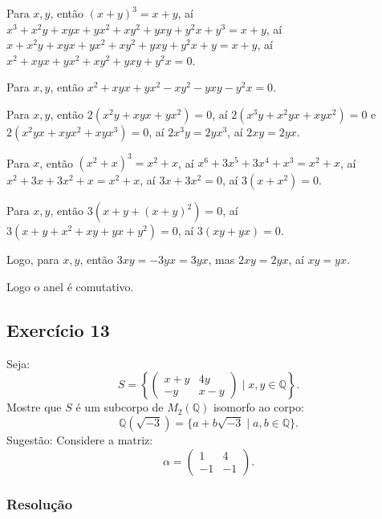 \documentclass[10pt,a4paper]{article}
\begin{document}
\medskip
\noindent
Para $x,y$, então $(x+y)^3=x+y$, aí $x^3+x^2y+xyx+yx^2+xy^2+yxy+y^2x+y^3=x+y$, aí $x+x^2y+xyx+yx^2+xy^2+yxy+y^2x+y=x+y$, aí $x^2+xyx+yx^2+xy^2+yxy+y^2x=0$.

\medskip
\noindent
Para $x,y$, então $x^2+xyx+yx^2-xy^2-yxy-y^2x=0$.

\medskip
\noindent
Para $x,y$, então $2(x^2y+xyx+yx^2)=0$, aí $2(x^3y+x^2yx+xyx^2)=0$ e $2(x^2yx+xyx^2+xyx^3)=0$, aí $2x^3y=2yx^3$, aí $2xy=2yx$.

\medskip
\noindent
Para $x$, então $(x^2+x)^3=x^2+x$, aí $x^6+3x^5+3x^4+x^3=x^2+x$, aí $x^2+3x+3x^2+x=x^2+x$, aí $3x+3x^2=0$, aí $3(x+x^2)=0$.

\medskip
\noindent
Para $x,y$, então $3(x+y+(x+y)^2)=0$, aí $3(x+y+x^2+xy+yx+y^2)=0$, aí $3(xy+yx)=0$.

\medskip
\noindent
Logo, para $x,y$, então $3xy=-3yx=3yx$, mas $2xy=2yx$, aí $xy=yx$.

\medskip
\noindent
Logo o anel é comutativo.

\subsection*{Exercício 13}

Seja:
\[
S=\left\{\begin{pmatrix}
x+y&4y\\-y&x-y
\end{pmatrix}\mid x,y\in\mathbb{Q}\right\}.
\]
Mostre que $S$ é um subcorpo de $M_2(\mathbb{Q})$ isomorfo ao corpo:
\[
\mathbb{Q}(\sqrt{-3})=\{a+b\sqrt{-3}\mid a,b\in\mathbb{Q}\}.
\]
Sugestão: Considere a matriz:
\[
\alpha=\begin{pmatrix}
1&4\\-1&-1
\end{pmatrix}.
\]

\subsubsection*{Resolução}
\end{document}
